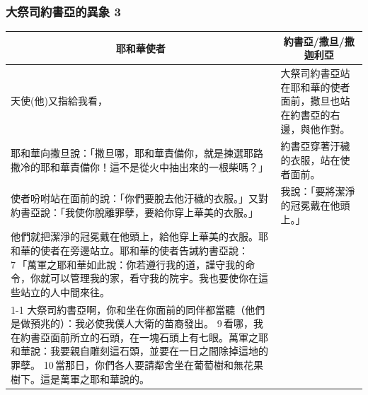 \subsubsection{大祭司約書亞的異象 3}
\begin{table}[H]
\centering
\begin{tabular}{p{11.25cm}|p{}}\hline\hline
\multicolumn{1}{c|}{耶和華使者}&\multicolumn{1}{c}{約書亞/撒旦/撒迦利亞}\\\hline
天使(他)又指給我看，
&大祭司約書亞站在耶和華的使者面前，撒旦也站在約書亞的右邊，與他作對。\\\hline

耶和華向撒旦說：「撒旦哪，耶和華責備你，就是揀選耶路撒冷的耶和華責備你！這不是從火中抽出來的一根柴嗎？」 
&約書亞穿著汙穢的衣服，站在使者面前。\\\hline
使者吩咐站在面前的說：「你們要脫去他汙穢的衣服。」又對約書亞說：「我使你脫離罪孽，要給你穿上華美的衣服。」 
&我說：「要將潔淨的冠冕戴在他頭上。」\\\hline
他們就把潔淨的冠冕戴在他頭上，給他穿上華美的衣服。耶和華的使者在旁邊站立。耶和華的使者告誡約書亞說： 7 「萬軍之耶和華如此說：你若遵行我的道，謹守我的命令，你就可以管理我的家，看守我的院宇。我也要使你在這些站立的人中間來往。&\multirow{2}{6cm}{}\\\cline{1-1}
大祭司約書亞啊，你和坐在你面前的同伴都當聽（他們是做預兆的）：我必使我僕人大衛的苗裔發出。 9 看哪，我在約書亞面前所立的石頭，在一塊石頭上有七眼。萬軍之耶和華說：我要親自雕刻這石頭，並要在一日之間除掉這地的罪孽。 10 當那日，你們各人要請鄰舍坐在葡萄樹和無花果樹下。這是萬軍之耶和華說的。&\\\hline
\end{tabular}
\end{table}


